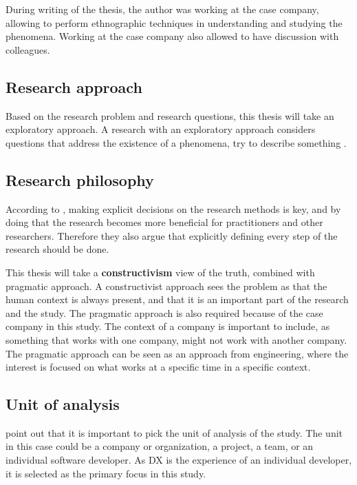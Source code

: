 \documentclass[english, 12pt, a4paper, sci, utf8, a-1b, online]{aaltothesis}
\begin{document}
During writing of the thesis, the author was working at the case company, allowing to perform ethnographic techniques in understanding and studying the phenomena. Working at the case company also allowed to have discussion with colleagues.    

\subsection{Research approach}

Based on the research problem and research questions, this thesis will take an exploratory approach. A research with an exploratory approach considers questions that address the existence of a phenomena, try to describe something \citep{easterbrook2008selecting}.

\subsection{Research philosophy}

According to \cite{easterbrook2008selecting}, making explicit decisions on the research methods is key, and by doing that the research becomes more beneficial for practitioners and other researchers. Therefore they also argue that explicitly defining every step of the research should be done.

This thesis will take a \textbf{constructivism} view of the truth, combined with pragmatic approach. A constructivist approach sees the problem as that the human context is always present, and that it is an important part of the research and the study. The pragmatic approach is also required because of the case company in this study. The context of a company is important to include, as something that works with one company, might not work with another company. The pragmatic approach can be seen as an approach from engineering, where the interest is focused on what works at a specific time in a specific context.

\subsection{Unit of analysis}

\cite{easterbrook2008selecting} point out that it is important to pick the unit of analysis of the study. The unit in this case could be a company or organization, a project, a team, or an individual software developer. As DX is the experience of an individual developer, it is selected as the primary focus in this study.
\end{document}
